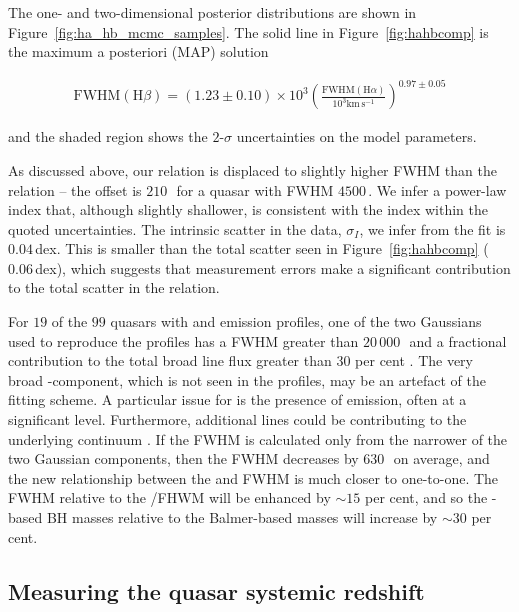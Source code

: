 The one- and two-dimensional posterior distributions are shown in Figure~\ref{fig:ha_hb_mcmc_samples}.
The solid line in Figure~\ref{fig:hahbcomp} is the maximum a posteriori (MAP) solution

\begingroup\makeatletter{}\check@mathfonts
\begin{eqnarray}
  \label{eq:ha2hb}
  \text{FWHM}(\text{H}\beta) = \left( 1.23 \pm 0.10 \right) \times 10^3 \left( \frac{\text{FWHM}(\text{H}\alpha)}{10^3 \text{km}\,\text{s}^{-1}} \right)^{0.97 \pm 0.05}
\end{eqnarray}
\endgroup

\noindent and the shaded region shows the $2$-$\sigma$ uncertainties on the model parameters.

As discussed above, our relation is displaced to slightly higher \hb FWHM than the \citet{greene05b} relation -- the offset is $210$\,\kms\, for a quasar with \ha FWHM $4500$\,\kms.
We infer a power-law index that, although slightly shallower, is consistent with the \citet{greene05b} index within the quoted uncertainties.
The intrinsic scatter in the data, $\sigma_I$, we infer from  the fit is $0.04$\,dex.
This is smaller than the total scatter seen in Figure~\ref{fig:hahbcomp} ($0.06$\,dex), which suggests that measurement errors make a significant contribution to the total scatter in the relation.

For $19$ of the $99$ quasars with \hb and \ha emission profiles, one of the two Gaussians used to reproduce the \hb profiles has a FWHM greater than $20$\,$000$\,\kms\, and a fractional contribution to the total \hb broad line flux greater than $30$ per cent \citep{marziani09,marziani13}.
The very broad \hbns-component, which is not seen in the \ha profiles, may be an artefact of the fitting scheme.
A particular issue for \hb is the presence of  emission, often at a significant level.
Furthermore, additional lines could be contributing to the underlying continuum \citep[e.g. the \ll$4922$,$5017$ doublet;][]{veron02,zamfir10}.
If the \hb FWHM is calculated only from the narrower of the two Gaussian components, then the \hb FWHM decreases by $630$\,\kms\, on average, and the new relationship between the \ha and \hb FWHM is much closer to one-to-one.
The  FWHM relative to the \hans/\hb FHWM will be enhanced by $\sim15$ per cent, and so the -based BH masses relative to the Balmer-based masses will increase by $\sim30$ per cent.

\subsection{Measuring the quasar systemic redshift}
\label{sec:zsys}

